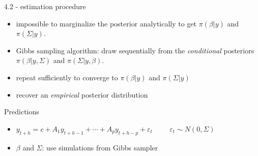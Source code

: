 \begin{frame}{4.2 - estimation procedure}
	\begin{itemize}
		\item impossible to marginalize the posterior analytically to get $\pi(\beta|y)$ and $\pi(\Sigma|y)$.
		\item Gibbs sampling algorithm: draw sequentially from the \textit{conditional} posteriors $\pi(\beta|y, \Sigma)$ and $\pi(\Sigma|y, \beta)$.
		\item repeat sufficiently to converge to $\pi(\beta|y)$ and $\pi(\Sigma|y)$
		\item recover an \textit{empirical} posterior distribution 
	\end{itemize}
	\pause
	\begin{block}{Predictions}
		\begin{itemize}
			\item $y_{t+h} = c + A_1 y_{t+h-1} + \cdots + A_p y_{t+h-p} + \varepsilon_t \hspace{1cm} \varepsilon_t \sim N(0, \Sigma)$
			\item $\beta$ and $\Sigma$: use simulations from Gibbs sampler
		\end{itemize}
	\end{block}
\end{frame}



